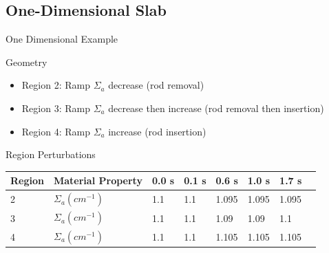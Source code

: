 \documentclass[8pt,xcolor=dvipnames]{beamer}
\begin{document}
\subsection{One-Dimensional Slab}

\begin{frame}{One Dimensional Example}

\begin{block}{Geometry}
\begin{figure}
\begin{center}
\end{center}
\end{figure}
\begin{itemize}
\item Region 2: Ramp $\Sigma_a$ decrease (rod removal)
\item Region 3: Ramp $\Sigma_a$ decrease then increase (rod removal then insertion)
\item Region 4: Ramp $\Sigma_a$ increase (rod insertion)
\end{itemize}
\end{block}

\begin{block}{Region Perturbations}
\centering
\begin{tabular}{llllllll}
\hline
Region & Material Property & 0.0 s & 0.1 s & 0.6 s & 1.0 s & 1.7 s \\
\hline
2 & $\Sigma_{a} (cm^{-1})$ & 1.1 & 1.1 & 1.095 & 1.095 & 1.095 \\
3 & $\Sigma_{a} (cm^{-1})$ & 1.1 & 1.1 & 1.09 & 1.09 & 1.1 \\
4 & $\Sigma_{a} (cm^{-1})$ & 1.1 & 1.1 & 1.105 & 1.105 & 1.105 \\
\hline
\end{tabular}
\end{block}

\end{frame}
\end{document}
